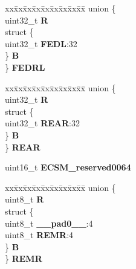 \begin{DoxyCompactItemize}
\begin{tabbing}
\end{tabbing}\item 
\mbox{\label{structECSM__tag_a7da519e409d7112cfef28ee0e4f7cbdd}} 
\begin{tabbing}
xx\=xx\=xx\=xx\=xx\=xx\=xx\=xx\=xx\=\kill
union \{\\
\>uint32\_t {\bfseries R}\\
\>struct \{\\
\>\>uint32\_t {\bfseries FEDL}:32\\
\>\} {\bfseries B}\\
\} {\bfseries FEDRL}\\

\end{tabbing}\item 
\mbox{\label{structECSM__tag_a672e92a481833edf4ff801f571a8e8cf}} 
\begin{tabbing}
xx\=xx\=xx\=xx\=xx\=xx\=xx\=xx\=xx\=\kill
union \{\\
\>uint32\_t {\bfseries R}\\
\>struct \{\\
\>\>uint32\_t {\bfseries REAR}:32\\
\>\} {\bfseries B}\\
\} {\bfseries REAR}\\

\end{tabbing}\item 
\mbox{\label{structECSM__tag_a723d8593a9e4ab2688d50d4e2668b1d5}} 
uint16\+\_\+t {\bfseries E\+C\+S\+M\+\_\+reserved0064}
\item 
\mbox{\label{structECSM__tag_adcec6037b6ade70652ecf5f4ed05f300}} 
\begin{tabbing}
xx\=xx\=xx\=xx\=xx\=xx\=xx\=xx\=xx\=\kill
union \{\\
\>uint8\_t {\bfseries R}\\
\>struct \{\\
\>\>uint8\_t {\bfseries \_\_pad0\_\_}:4\\
\>\>uint8\_t {\bfseries REMR}:4\\
\>\} {\bfseries B}\\
\} {\bfseries REMR}\\


\end{tabbing}
\end{DoxyCompactItemize}
